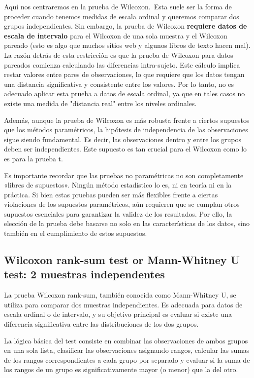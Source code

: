 \documentclass{config/apuntes}\usepackage[]{graphicx}\usepackage[]{xcolor}
\begin{document}
Aquí nos centraremos en la prueba de Wilcoxon.\marginpar[\footnotesize !!!!] \ Esta suele ser la forma de proceder cuando tenemos medidas de escala ordinal y queremos comparar dos grupos independientes. Sin embargo, la prueba de Wilcoxon \textbf{requiere datos de escala de intervalo} para el Wilcoxon de una sola muestra y el Wilcoxon pareado (esto es algo que muchos sitios web y algunos libros de texto hacen mal). La razón detrás de esta restricción es que la prueba de Wilcoxon para datos pareados comienza calculando las diferencias intra-sujeto. Este cálculo implica restar valores entre pares de observaciones, lo que requiere que los datos tengan una distancia significativa y consistente entre los valores. Por lo tanto, no es adecuado aplicar esta prueba a datos de escala ordinal, ya que en tales casos no existe una medida de "distancia real" entre los niveles ordinales.

Además, aunque la prueba de Wilcoxon es más robusta frente a ciertos supuestos que los métodos paramétricos, la hipótesis de independencia de las observaciones sigue siendo fundamental. Es decir, las observaciones dentro y entre los grupos deben ser independientes. Este supuesto es tan crucial para el Wilcoxon como lo es para la prueba t.

Es importante recordar que las pruebas no paramétricas no son completamente «libres de supuestos». Ningún método estadístico lo es, ni en teoría ni en la práctica. Si bien estas pruebas pueden ser más flexibles frente a ciertas violaciones de los supuestos paramétricos, aún requieren que se cumplan otros supuestos esenciales para garantizar la validez de los resultados. Por ello, la elección de la prueba debe basarse no solo en las características de los datos, sino también en el cumplimiento de estos supuestos.

\subsection{Wilcoxon rank-sum test or Mann-Whitney U test: 2 muestras independentes}
La prueba Wilcoxon rank-sum, también conocida como Mann-Whitney U, se utiliza para comparar dos muestras independientes. Es adecuada para datos de escala ordinal o de intervalo, y su objetivo principal es evaluar si existe una diferencia significativa entre las distribuciones de los dos grupos.

La lógica básica del test consiste en combinar las observaciones de ambos grupos en una sola lista, clasificar las observaciones asignando rangos, calcular las sumas de los rangos correspondientes a cada grupo por separado y evaluar si la suma de los rangos de un grupo es significativamente mayor (o menor) que la del otro. 
\end{document}

